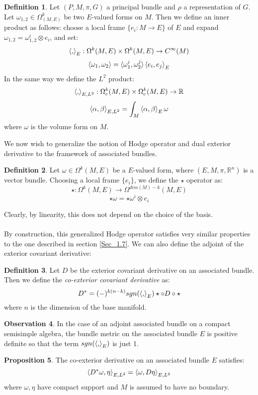 \documentclass[12pt,a4paper]{report}
\theoremstyle{definition}
\newtheorem{Def}{Definition}[chapter]
\theoremstyle{Theorem}
\newtheorem{Prop}[Def]{Proposition}
\theoremstyle{definition}
\theoremstyle{definition}
\newtheorem{Obs}[Def]{Observation}
\begin{document}
	\begin{Def}
		Let $(P,M,\pi,G)$ a principal bundle and $\rho$ a representation of $G$. Let $\omega_{1,2}\in \Omega^k_(M,E)$ be two $E$-valued forms on $M$. Then we define an inner product as follows: choose a local frame $\{e_i:M\rightarrow E\}$ of $E$ and expand $\omega_{1,2}=\omega_{1,2}^i\otimes e_i$, and set:
		$$\braket{,}_{E}:\Omega^k(M,E)\times \Omega^k(M,E)\rightarrow C^\infty(M)$$
		$$\braket{\omega_1,\omega_2}=\braket{\omega_1^i,\omega_2^j}\braket{e_i,e_j}_E$$
		In the same way we define the $L^2$ product:
		$$\braket{,}_{E,L^2}:\Omega^k_c(M,E)\times\Omega^k_c(M,E)\rightarrow \mathbb{R}$$
		$$\braket{\alpha,\beta}_{E,L^2}=\int_M\braket{\alpha,\beta}_E\omega$$
		where $\omega$ is the volume form on $M$.
	\end{Def}
	We now wish to generalize the notion of Hodge operator and dual exterior derivative to the framework of associated bundles.
	\begin{Def}
		Let $\omega\in\Omega^k(M,E)$ be a $E$-valued form, where $(E,M,\pi,\mathbb{R}^n)$ is a vector bundle. Choosing a local frame $\{e_i\}$, we define the $\star$ operator as:
		$$\star:\Omega^k(M,E)\rightarrow \Omega^{dim(M)-k}(M,E)$$
		$$\star\omega=\star\omega^i\otimes e_i$$ 
	\end{Def}
	Clearly, by linearity, this does not depend on the choice of the basis.\\
	\\
	By construction, this generalized Hodge operator satisfies very similar properties to the one described in section \ref{Sec_1.7}. We can also define the adjoint of the exterior covariant derivative:
	\begin{Def}
		Let $D$ be the exterior covariant derivative on an associated bundle. Then we define the \textit{co-exterior covariant derivative} as:
		$$D^*=(-)^{k(n-k)}sgn(\braket{,}_E)\star\circ D\circ\star$$
		where $n$ is the dimension of the base manifold.
	\end{Def}
	\begin{Obs}
		In the case of an adjoint associated bundle on a compact semisimple algebra, the bundle metric on the associated bundle $E$ is positive definite so that the term $sgn(\braket{,}_E)$ is just 1.
	\end{Obs}
	\begin{Prop}\label{Prop_7.3.2}
		The co-exterior derivative on an associated bundle $E$ satisfies:
		$$\braket{D^*\omega,\eta}_{E,L^2}=\braket{\omega,D\eta}_{E,L^2}$$
		where $\omega,\eta$ have compact support and $M$ is assumed to have no boundary.
	\end{Prop}
\end{document}
